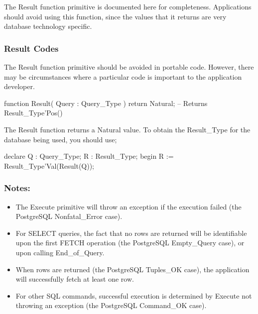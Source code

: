 \documentclass[english,letterpaper]{book}
\begin{document}
The Result function primitive is documented here for completeness.
Applications should avoid using this function, since the values that
it returns are very database technology specific.


\subsubsection{Result Codes}

The Result function primitive should be avoided in portable code. However,
there may be circumstances where a particular code is important to the
application developer.

\begin{Code}
function Result(
   Query : Query_Type
) return Natural;
  -- Returns Result_Type'Pos()
\end{Code}

The Result function returns a Natural value. To obtain the Result\_Type
for the database being used, you should use;

\begin{Example}
declare
   Q : Query_Type;
   R : Result_Type;
begin
   R := Result_Type'Val(Result(Q));
\end{Example}

\subsubsection{Notes:}

\begin{itemize}
   \item The Execute primitive will throw an exception if the execution failed
         (the PostgreSQL Nonfatal\_Error case).
   \item For SELECT queries, the fact that no rows are returned will be identifiable upon
         the first FETCH operation (the PostgreSQL Empty\_Query
         case), or upon calling End\_of\_Query.
   \item When rows are returned (the PostgreSQL Tuples\_OK case), the application will
         successfully fetch at least one row.
   \item For other SQL commands, successful execution is determined by Execute
         not throwing an exception (the PostgreSQL Command\_OK case). 
\end{itemize}
\end{document}
